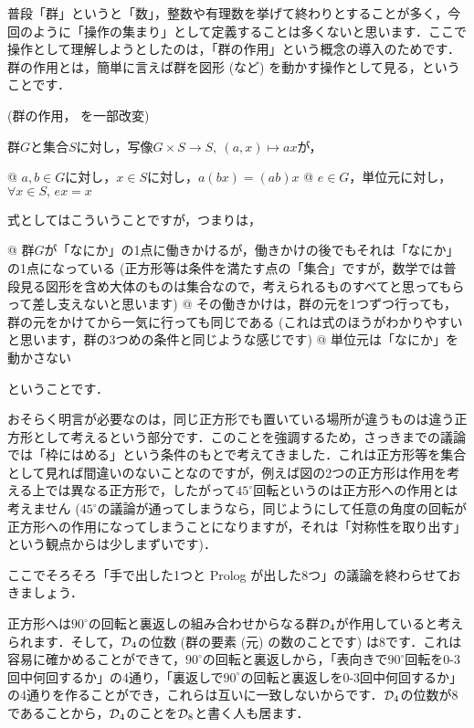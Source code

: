 \documentclass[11pt]{jsarticle}
\begin{document}
普段「群」というと「数」，整数や有理数を挙げて終わりとすることが多く，今回のように「操作の集まり」として定義することは多くないと思います．ここで操作として理解しようとしたのは，「群の作用」という概念の導入のためです．群の作用とは，簡単に言えば群を図形 (など) を動かす操作として見る，ということです．

\begin{defi}(群の作用，\cite[p. 33]{katura} を一部改変)

  群$G$と集合$S$に対し，写像$G\times S\to S,\ (a,x)\mapsto ax $が，
  \begin{easylist}[enumerate]
    @ $a,b\in G$に対し，$x\in S$に対し，$a(bx) = (ab)x $
    @ $e\in G$，単位元に対し，$\forall x\in S,\, ex = x$
  \end{easylist}
\end{defi}

式としてはこういうことですが，つまりは，
\begin{easylist}[enumerate]
  @ 群$G$が「なにか」の1点に働きかけるが，働きかけの後でもそれは「なにか」の1点になっている (正方形等は条件を満たす点の「集合」ですが，数学では普段見る図形を含め大体のものは集合なので，考えられるものすべてと思ってもらって差し支えないと思います)
  @ その働きかけは，群の元を1つずつ行っても，群の元をかけてから一気に行っても同じである (これは式のほうがわかりやすいと思います，群の3つめの条件と同じような感じです)
  @ 単位元は「なにか」を動かさない
\end{easylist}
ということです．

おそらく明言が必要なのは，同じ正方形でも置いている場所が違うものは違う正方形として考えるという部分です．このことを強調するため，さっきまでの議論では「枠にはめる」という条件のもとで考えてきました．これは正方形等を集合として見れば間違いのないことなのですが，例えば図の2つの正方形は作用を考える上では異なる正方形で，したがって$45^\circ$回転というのは正方形への作用とは考えません ($45^\circ $の議論が通ってしまうなら，同じようにして任意の角度の回転が正方形への作用になってしまうことになりますが，それは「対称性を取り出す」という観点からは少しまずいです)．

ここでそろそろ「手で出した1つと Prolog が出した8つ」の議論を終わらせておきましょう．

正方形へは$90^\circ$の回転と裏返しの組み合わせからなる群$\operatorname{\mathcal{D}}_4$が作用していると考えられます．そして，$\operatorname{\mathcal{D}}_4$の位数 (群の要素 (元) の数のことです) は8です．これは容易に確かめることができて，$90^\circ$の回転と裏返しから，「表向きで$90^\circ$回転を0-3回中何回するか」の4通り，「裏返しで$90^\circ$の回転と裏返しを0-3回中何回するか」の4通りを作ることができ，これらは互いに一致しないからです．$\operatorname{\mathcal{D}}_4$の位数が8であることから，$\operatorname{\mathcal{D}}_4$のことを$\operatorname{\mathcal{D}}_8$と書く人も居ます．
\end{document}
